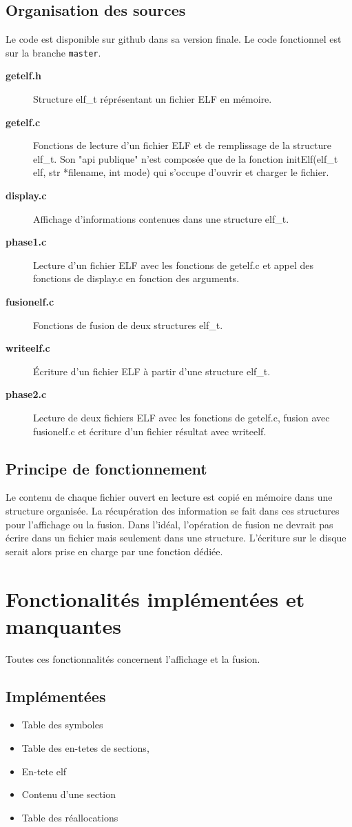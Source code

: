\documentclass[10pt,oneside]{article}   %
\begin{document}
	\subsection{Organisation des sources}
	Le code est disponible sur github\cite{github} dans sa version finale. Le code fonctionnel est sur la branche \texttt{master}.
	\begin{description}
		\item [\bf{getelf.h}] Structure elf\_t réprésentant un fichier ELF en mémoire.
		\item [\bf{getelf.c}] Fonctions de lecture d'un fichier ELF et de remplissage de la structure elf\_t. Son "api publique" n'est composée que de la fonction initElf(elf\_t elf, str *filename, int mode) qui s'occupe d'ouvrir et charger le fichier.
		\item [\bf{display.c}] Affichage d'informations contenues dans une structure elf\_t.
		\item [\bf{phase1.c}] Lecture d'un fichier ELF avec les fonctions de getelf.c et appel des fonctions de display.c en fonction des arguments.
		\item [\bf{fusionelf.c}] Fonctions de fusion de deux structures elf\_t.
		\item [\bf{writeelf.c}] Écriture d'un fichier ELF à partir d'une structure elf\_t.
		\item [\bf{phase2.c}] Lecture de deux fichiers ELF avec les fonctions de getelf.c, fusion avec fusionelf.c et écriture d'un fichier résultat avec writeelf.
	\end{description}

	\subsection{Principe de fonctionnement}
	Le contenu de chaque fichier ouvert en lecture est copié en mémoire dans une structure organisée. La récupération des information se fait dans ces structures pour l'affichage ou la fusion. Dans l'idéal, l'opération de fusion ne devrait pas écrire dans un fichier mais seulement dans une structure. L'écriture sur le disque serait alors prise en charge par une fonction dédiée.


\section{Fonctionalités implémentées et manquantes}
	Toutes ces fonctionnalités concernent l'affichage et la fusion.
	\subsection{Implémentées}
		\begin{itemize}
			\item Table des symboles
			\item Table des en-tetes de sections,
			\item En-tete elf
			\item Contenu d'une section
			\item Table des réallocations
		\end{itemize}
\end{document}
